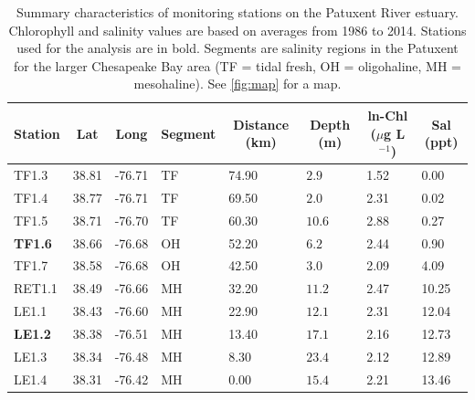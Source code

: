 \documentclass[letterpaper,12pt,oneside]{article}\usepackage[]{graphicx}\usepackage[]{color}
\newcommand{\mugl}{$\mu$g L$^{-1}$}
\begin{document}
\begin{table}[!tbp]
\caption{Summary characteristics of monitoring stations on the Patuxent River estuary.  Chlorophyll and salinity values are based on averages from 1986 to 2014.  Stations used for the analysis are in bold.  Segments are salinity regions in the Patuxent for the larger Chesapeake Bay area (TF = tidal fresh, OH = oligohaline, MH = mesohaline).  See \cref{fig:map} for a map.\label{tab:statsum}} 
\begin{center}
\begin{tabular}{llllllll}
\hline\hline
\multicolumn{1}{l}{Station}&\multicolumn{1}{c}{Lat}&\multicolumn{1}{c}{Long}&\multicolumn{1}{c}{Segment}&\multicolumn{1}{c}{Distance (km)}&\multicolumn{1}{c}{Depth (m)}&\multicolumn{1}{c}{ln-Chl (\mugl)}&\multicolumn{1}{c}{Sal (ppt)}\tabularnewline
\hline
TF1.3&38.81&-76.71&TF&74.90&$ 2.9$&1.52& 0.00\tabularnewline
TF1.4&38.77&-76.71&TF&69.50&$ 2.0$&2.31& 0.02\tabularnewline
TF1.5&38.71&-76.70&TF&60.30&$10.6$&2.88& 0.27\tabularnewline
{\bf TF1.6}&38.66&-76.68&OH&52.20&$ 6.2$&2.44& 0.90\tabularnewline
TF1.7&38.58&-76.68&OH&42.50&$ 3.0$&2.09& 4.09\tabularnewline
RET1.1&38.49&-76.66&MH&32.20&$11.2$&2.47&10.25\tabularnewline
LE1.1&38.43&-76.60&MH&22.90&$12.1$&2.31&12.04\tabularnewline
{\bf LE1.2}&38.38&-76.51&MH&13.40&$17.1$&2.16&12.73\tabularnewline
LE1.3&38.34&-76.48&MH& 8.30&$23.4$&2.12&12.89\tabularnewline
LE1.4&38.31&-76.42&MH& 0.00&$15.4$&2.21&13.46\tabularnewline
\hline
\end{tabular}\end{center}

\end{table}


\end{document}

